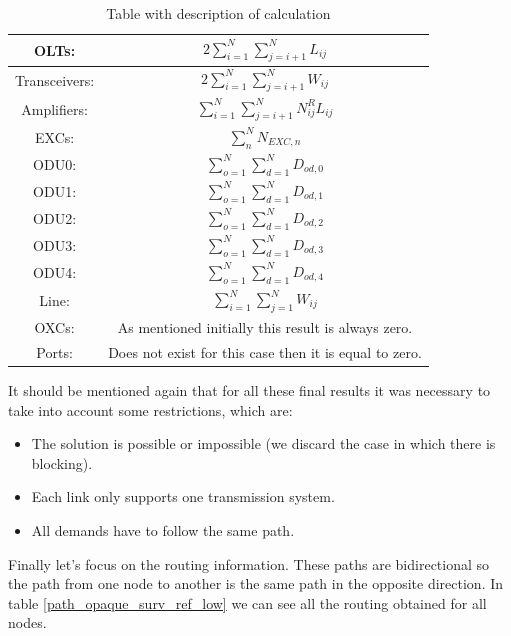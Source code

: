 \begin{table}[h!]
\centering
\begin{tabular}{|| c | c ||}
 \hline
 OLTs: & \(\displaystyle 2 \sum_{i=1}^{N}\sum_{j=i+1}^{N} L_{ij} \) \\ \hline
 Transceivers: & \(\displaystyle 2 \sum_{i=1}^{N}\sum_{j=i+1}^{N} W_{ij} \) \\ \hline
 Amplifiers: & \(\displaystyle \sum_{i=1}^{N}\sum_{j=i+1}^{N} N^R_{ij} L_{ij} \) \\ \hline
 EXCs: & \(\displaystyle \sum_n^N N_{EXC,n} \) \\ \hline
 ODU0: & \(\displaystyle \sum_{o=1}^{N}\sum_{d=1}^{N} D_{od,0} \) \\ \hline
 ODU1: & \(\displaystyle \sum_{o=1}^{N}\sum_{d=1}^{N} D_{od,1} \) \\ \hline
 ODU2: & \(\displaystyle \sum_{o=1}^{N}\sum_{d=1}^{N} D_{od,2} \)\\ \hline
 ODU3: & \(\displaystyle \sum_{o=1}^{N}\sum_{d=1}^{N} D_{od,3} \) \\ \hline
 ODU4: & \(\displaystyle \sum_{o=1}^{N}\sum_{d=1}^{N} D_{od,4} \) \\ \hline
 Line: & \(\displaystyle \sum_{i=1}^{N}\sum_{j=1}^{N} W_{ij} \) \\ \hline
 OXCs: & As mentioned initially this result is always zero. \\ \hline
 Ports: & Does not exist for this case then it is equal to zero. \\
 \hline
 \end{tabular}
\caption{Table with description of calculation}
\label{formulas_opaque_surv_ref_low}
\end{table}

\vspace{17pt}
It should be mentioned again that for all these final results it was necessary to take into account some restrictions, which are:
\begin{itemize}
  \item The solution is possible or impossible (we discard the case in which there is blocking).
  \item Each link only supports one transmission system.
  \item All demands have to follow the same path.
\end{itemize}


\newpage
Finally let's focus on the routing information. These paths are bidirectional so the path from one node to another is the same path in the opposite direction. In table \ref{path_opaque_surv_ref_low} we can see all the routing obtained for all nodes.\\

